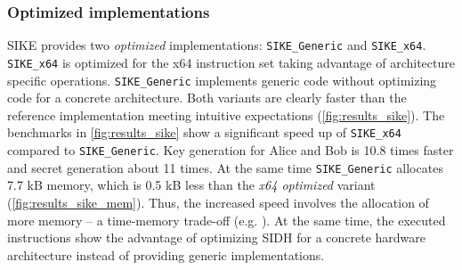 \subsubsection{Optimized implementations}
\gls{SIKE} provides two \textit{optimized} implementations: \texttt{SIKE\_Generic} and \texttt{SIKE\_x64}. \texttt{SIKE\_x64} is optimized for the x64 instruction set taking advantage of architecture specific operations. \texttt{SIKE\_Generic} implements generic code without optimizing code for a concrete architecture.
Both variants are clearly faster than the reference implementation meeting intuitive expectations (\autoref{fig:results_sike}). The benchmarks in \autoref{fig:results_sike} show a significant speed up of \texttt{SIKE\_x64} compared to \texttt{SIKE\_Generic}. Key generation for Alice and Bob is 10.8 times faster and secret generation about 11 times. At the same time \texttt{SIKE\_Generic} allocates 7.7 \gls{kB} memory, which is 0.5 \gls{kB} less than the \textit{x64 optimized} variant (\autoref{fig:results_sike_mem}). 
Thus, the increased speed involves the allocation of more memory -- a time-memory trade-off (e.g. \parencite{1056220}). At the same time, the executed instructions show the advantage of optimizing \gls{SIDH} for a concrete hardware architecture instead of providing generic implementations.

